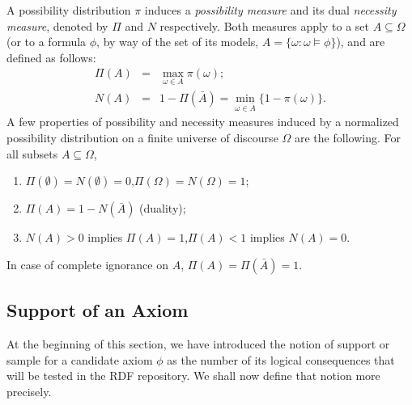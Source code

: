 \documentclass{llncs}
\begin{document}
A possibility distribution $\pi$ induces a \emph{possibility
measure} and its dual \emph{necessity
measure}, denoted by $\Pi$ and $N$
respectively. Both measures apply to a set $A \subseteq\Omega$ (or to a
formula $\phi$, by way of the set of its models, $A = \{\omega : \omega \models \phi\}$),
and are defined as follows:
\begin{eqnarray}
  \Pi(A) &=& \max_{\omega\in A} \pi(\omega); \\
  N(A)   &=& 1 - \Pi(\bar{A}) = \min_{\omega\in \bar{A}} \{1 - \pi(\omega)\}.
\end{eqnarray}
A few properties of possibility and necessity measures 
induced by a normalized possibility distribution on a finite universe of
discourse $\Omega$ are the following. For all subsets $A\subseteq \Omega$,
\begin{enumerate}
  \item $\Pi(\emptyset) = N(\emptyset) = 0$,\quad $\Pi(\Omega) = N(\Omega) = 1$;
  \item $\Pi(A) = 1 - N(\bar{A})$ (duality);
  \item $N(A) > 0$ implies $\Pi(A) = 1$,\quad $\Pi(A) < 1$ implies $N(A) = 0$.
\end{enumerate}
In case of complete ignorance on $A$, $\Pi(A) = \Pi(\bar{A}) = 1$.

\subsection{Support of an Axiom}
\label{support}

At the beginning of this section, we have introduced the notion of support or sample
for a candidate axiom $\phi$ as the number of its logical consequences that will be
tested in the RDF repository. We shall now define that notion more precisely.
\end{document}
